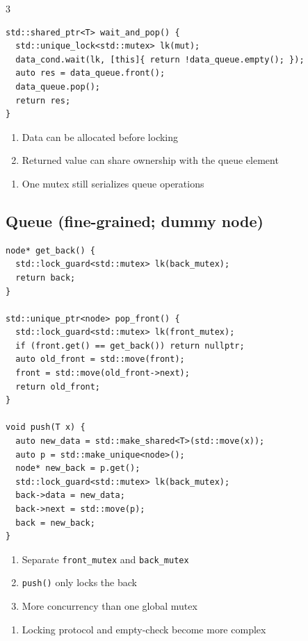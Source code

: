 \documentclass[12pt, a4paper]{article}
\begin{document}
\begin{multicols*}{3}
\begin{lstlisting}[basicstyle=\ttfamily\scriptsize]
std::shared_ptr<T> wait_and_pop() {
  std::unique_lock<std::mutex> lk(mut);
  data_cond.wait(lk, [this]{ return !data_queue.empty(); });
  auto res = data_queue.front();
  data_queue.pop();
  return res;
}
\end{lstlisting}\vspace{-1em}
\begin{enumerate}[$+$]
  \item Data can be allocated before locking
  \item Returned value can share ownership with the queue element
\end{enumerate}
\begin{enumerate}[$-$]\vspace{-2pt}
  \item One mutex still serializes queue operations
\end{enumerate}

\subsection{Queue (fine-grained; dummy node)}
\begin{lstlisting}[basicstyle=\ttfamily\scriptsize]
node* get_back() {
  std::lock_guard<std::mutex> lk(back_mutex);
  return back;
}

std::unique_ptr<node> pop_front() {
  std::lock_guard<std::mutex> lk(front_mutex);
  if (front.get() == get_back()) return nullptr;
  auto old_front = std::move(front);
  front = std::move(old_front->next);
  return old_front;
}

void push(T x) {
  auto new_data = std::make_shared<T>(std::move(x));
  auto p = std::make_unique<node>();
  node* new_back = p.get();
  std::lock_guard<std::mutex> lk(back_mutex);
  back->data = new_data;
  back->next = std::move(p);
  back = new_back;
}
\end{lstlisting}\vspace{-1em}
\begin{enumerate}[$+$]
  \item Separate \lstinline|front_mutex| and \lstinline|back_mutex|
  \item \lstinline|push()| only locks the back
  \item More concurrency than one global mutex
\end{enumerate}
\begin{enumerate}[$-$]\vspace{-2pt}
  \item Locking protocol and empty-check become more complex
\end{enumerate}
\vspace{-1em}
\colbreak

\end{multicols*}
\end{document}
